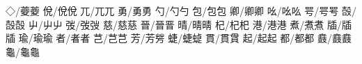 ◇/䕫︀䕫 侻/侻︀侻 兀/兀︀兀 勇/勇︁勇 勺/勺︁勺 包/包︀包 卿/卿︁卿 吆/吆︀吆 咢/咢︀咢 嗀/嗀︀嗀 %
屮/屮︁屮 弢/弢︀弢 慈/慈︀慈 晉/晉︀晉 晴/晴︀晴 杞/杞︀杞 港/港︀港 煮/煮︀煮 牐/牐︀牐 瑜/瑜︀瑜 %
者/者︀者 芑/芑︀芑 芳/芳︀芳 蜨/蜨︀蜨 貫/貫︀貫 起/起︀起 都/都︀都 鼖/鼖︀鼖 龜/龜︀龜 
